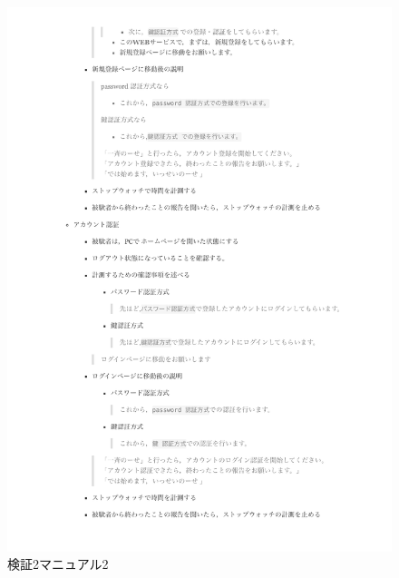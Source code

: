     \vspace{4cm}%
    \begin{figure}[H]
        \includegraphics[width=15cm]{./fig/chapter4/inspect_2/manual/manual_2.pdf}
        \caption{検証2マニュアル2}
        \label{検証２マニュアル２}
    \end{figure}

